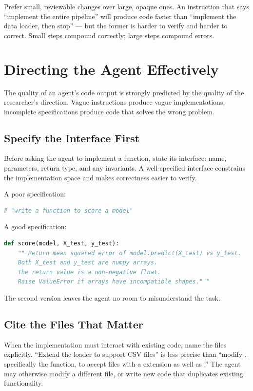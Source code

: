 \begin{principle}
\label{principle:IncrementalDevelopment}
Prefer small, reviewable changes over large, opaque ones.
An instruction that says ``implement the entire pipeline'' will produce code faster than ``implement the data loader, then stop'' — but the former is harder to verify and harder to correct.
Small steps compound correctly; large steps compound errors.
\end{principle}

\section{Directing the Agent Effectively}

The quality of an agent's code output is strongly predicted by the quality of the researcher's direction.
Vague instructions produce vague implementations; incomplete specifications produce code that solves the wrong problem.

\subsection{Specify the Interface First}

Before asking the agent to implement a function, state its interface: name, parameters, return type, and any invariants.
A well-specified interface constrains the implementation space and makes correctness easier to verify.

\begin{example}
A poor specification:
\begin{lstlisting}[language=python]
# "write a function to score a model"
\end{lstlisting}
A good specification:
\begin{lstlisting}[language=python]
def score(model, X_test, y_test):
    """Return mean squared error of model.predict(X_test) vs y_test.
    Both X_test and y_test are numpy arrays.
    The return value is a non-negative float.
    Raise ValueError if arrays have incompatible shapes."""
\end{lstlisting}
The second version leaves the agent no room to misunderstand the task.
\end{example}

\subsection{Cite the Files That Matter}

When the implementation must interact with existing code, name the files explicitly.
``Extend the loader to support CSV files'' is less precise than ``modify , specifically the  function, to accept files with a  extension as well as .''
The agent may otherwise modify a different file, or write new code that duplicates existing functionality.

